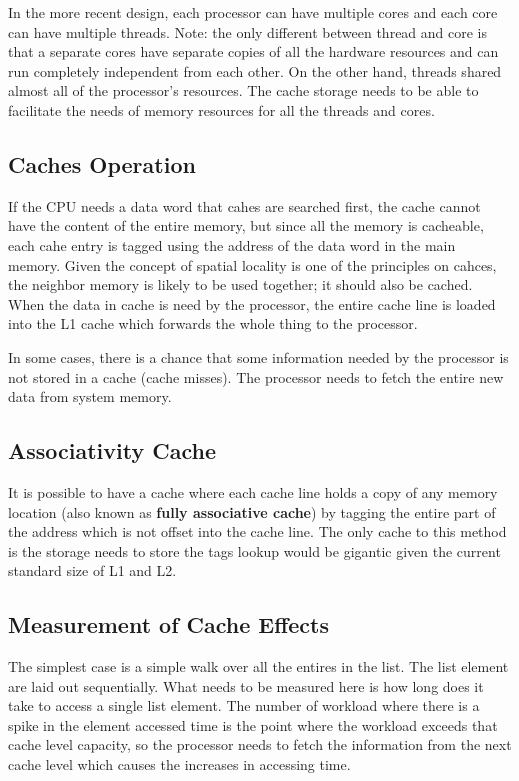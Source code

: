 \documentclass[journal]{IEEEtran}
\begin{document}
In the more recent design, each processor can have multiple cores and each
core can have multiple threads. Note: the only different between thread and 
core is that a separate cores
have separate copies of all the hardware resources and can run completely
independent from each other. On the other hand, threads shared almost all of
the processor's resources. The cache storage needs to be able to 
facilitate the needs of memory resources for all the threads and cores. 

\subsection{Caches Operation}
If the CPU needs a data word that cahes are searched first, the cache 
cannot have the content of the entire memory, but since all the memory is 
cacheable, each cahe entry is tagged using the address of the data word 
in the main memory. Given the concept of spatial locality is one of the 
principles on cahces, the neighbor memory is likely to be used together; 
it should also be cached. When the data in cache is need by the processor,
the entire cache line is loaded into the L1 cache which forwards the whole 
thing to the processor. \newline

In some cases, there is a chance that some information needed by the 
processor is not stored in a cache (cache misses). The processor needs to
fetch the entire new data from system memory. 

\subsection{Associativity Cache}
It is possible to have a cache where each cache line holds a copy of any 
memory location (also known as \textbf{fully associative cache}) by tagging
the entire part of the address which is not offset into the cache line. 
The only cache to this method is the storage needs to store the tags lookup
would be gigantic given the current standard size of L1 and L2.
\newline

\subsection{Measurement of Cache Effects}
The simplest case is a simple walk over all the entires in the list. The list
element are laid out sequentially. What needs to be measured here is how long
does it take to access a single list element. The number of workload where
there is a spike in the element accessed time is the point where the workload
exceeds that cache level capacity, so the processor needs to fetch the 
information from the next cache level which causes the increases in accessing
time.
\end{document}
